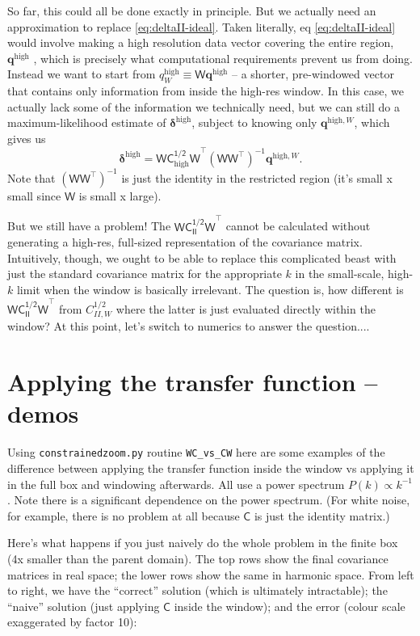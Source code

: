 \documentclass[11pt,a4paper,preprint]{aastex}
\newcommand{\high}{\mathrm{high}}
\newcommand{\bmath}[1]{\ensuremath{\bm{#1}}}
\renewcommand{\vec}[1]{\bmath{#1}}
\begin{document}
So far, this could all be done exactly in principle. But we actually need an approximation to replace \eqref{eq:deltaII-ideal}.
Taken literally, eq  \eqref{eq:deltaII-ideal} would involve making a high
resolution data vector covering the entire region, $\vec{q}^{\high}$ ,
which is precisely what computational requirements prevent us from
doing. Instead we want to start from $q^{\high}_W \equiv
\mathsf{W}\vec{q}^{\high}$ -- a shorter, pre-windowed vector that
contains only information from inside the high-res window. In this
case, we actually lack some of the information we technically need,
but we can still do a maximum-likelihood estimate of
$\vec{\delta}^{\high}$, subject to knowing only $\vec{q}^{\high,W}$, which
gives us
\begin{equation}
\vec{\delta}^{\high} = \mathsf{WC_{\high}^{1/2}W}^{\top} (\mathsf{WW}^{\top})^{-1} \vec{q}^{\high,W} \textrm{.}
\end{equation}
Note that $(\mathsf{WW}^{\top})^{-1}$ is just the identity in the
restricted region (it's small x small since $\mathsf{W}$ is small x large).

But we still have a problem! The $\mathsf{WC_{II}^{1/2}W}^{\top}$
cannot be calculated without generating a high-res, full-sized
representation of the covariance matrix. Intuitively, though, we ought
to be able to replace this complicated beast with just the standard
covariance matrix for the appropriate $k$ in the small-scale, high-$k$
limit when the window is basically irrelevant. The question is, how
different is $\mathsf{WC_{II}^{1/2}W}^{\top}$ from $C_{II,W}^{1/2}$
where the latter is just evaluated directly within the window?
At this point, let's switch to numerics to answer the question....


\section{Applying the transfer function -- demos}

Using {\tt constrainedzoom.py} routine {\tt WC\_vs\_CW} here are some
examples of the difference between applying the transfer function
inside the window vs applying it in the full box and windowing
afterwards. All use a power spectrum $P(k) \propto k^{-1}$. Note there
is a significant dependence on the power spectrum. (For white noise,
for example, there is no problem at all because $\mathsf{C}$ is just
the identity matrix.)

Here's what happens if you just naively do the whole problem in the
finite box (4x smaller than the parent domain). The top rows show the
final covariance matrices in real space; the lower rows show the same
in harmonic space. From left to right, we have the ``correct''
solution (which is ultimately intractable); the ``naive'' solution
(just applying $\mathsf{C}$ inside the window); and the error (colour
scale exaggerated by factor 10):
\end{document}
